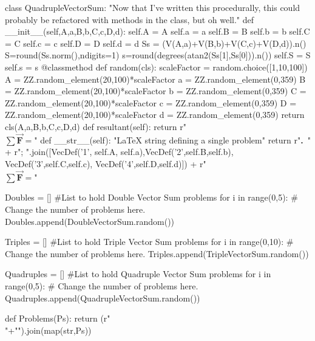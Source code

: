 \documentclass[letterpaper,11pt]{amsart}
\newcounter{Qcounter}
\newcommand{\Q}{\noindent\stepcounter{Qcounter}\textbf{\arabic{Qcounter}.}\ } %
\newcommand{\A}[1]{} %
\begin{document}
\begin{sagesilent}
class QuadrupleVectorSum:
    "Now that I've written this procedurally, this could probably be refactored with methods in the class, but oh well." 
    def __init__(self,A,a,B,b,C,c,D,d):
        self.A = A
        self.a = a
        self.B = B
        self.b = b
        self.C = C
        self.c = c
        self.D = D
        self.d = d
        Ss = (V(A,a)+V(B,b)+V(C,c)+V(D,d)).n()
        S=round(Ss.norm(),ndigits=1)
        s=round(degrees(atan2(Ss[1],Ss[0])).n())
        self.S = S
        self.s = s
    @classmethod
    def random(cls):
        scaleFactor = random.choice([1,10,100])
        A = ZZ.random_element(20,100)*scaleFactor
        a = ZZ.random_element(0,359)
        B = ZZ.random_element(20,100)*scaleFactor
        b = ZZ.random_element(0,359)
        C = ZZ.random_element(20,100)*scaleFactor
        c = ZZ.random_element(0,359)
        D = ZZ.random_element(20,100)*scaleFactor
        d = ZZ.random_element(0,359)        
        return cls(A,a,B,b,C,c,D,d)
    def resultant(self):
        return r"\\\indent  $\sum\vec{\mathbf{F}}=$\A{$" + VecDesc(self.S,self.s) + r"$}"
    def __str__(self):
        "LaTeX string defining a single problem"
        return r"\Q " + r"; ".join([VecDef('1', self.A, self.a),VecDef('2',self.B,self.b), VecDef('3',self.C,self.c), VecDef('4',self.D,self.d)]) + r"\\\indent $\sum\vec{\mathbf{F}}=$\A{$" + VecGradingDesc(self.S,self.s) + r"$}"
        
Doubles = [] #List to hold Double Vector Sum problems
for i in range(0,5): # Change the number of problems here.
    Doubles.append(DoubleVectorSum.random())

Triples = [] #List to hold Triple Vector Sum problems
for i in range(0,10): # Change the number of problems here.
    Triples.append(TripleVectorSum.random())
 
Quadruples = [] #List to hold Quadruple Vector Sum problems
for i in range(0,5): # Change the number of problems here.
    Quadruples.append(QuadrupleVectorSum.random())
                    
def Problems(Ps):
    return (r"\\"+"\n").join(map(str,Ps))

 \end{sagesilent}
\end{document}
